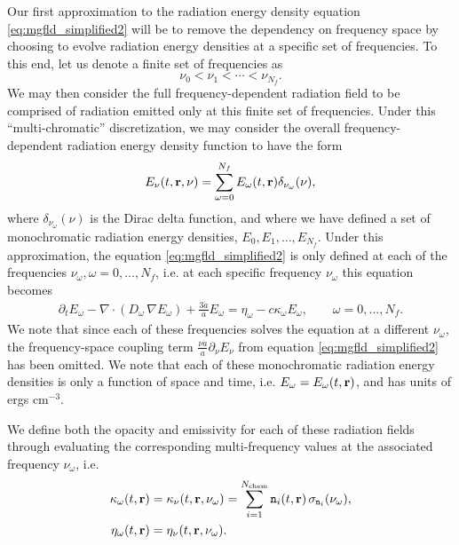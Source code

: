 \documentclass[10pt]{article}
\renewcommand{\(}{\left(}
\renewcommand{\)}{\right)}
\newcommand{\rvec}{{\bf r}}
\newcommand{\adot}{\dot{a}}
\newcommand{\Enu}{E_{\nu}}
\newcommand{\mn}{{\tt n}}
\begin{document}
Our first approximation to the radiation energy density equation
\eqref{eq:mgfld_simplified2} will be to remove the dependency on
frequency space by choosing to evolve radiation energy densities at a
specific set of frequencies.  To this end, let us denote a finite set
of frequencies as
\begin{equation}
\label{eq:multichromatic_frequencies}
  \nu_0 < \nu_1 < \cdots < \nu_{N_f}.
\end{equation}
We may then consider the full frequency-dependent radiation field to
be comprised of radiation emitted only at this finite set of
frequencies.  Under this ``multi-chromatic'' discretization, we may
consider the overall frequency-dependent radiation energy density
function to have the form 
\begin{equation}
\label{eq:multichromatic_radiation}
  \Enu(t,\rvec,\nu) = \sum_{\omega=0}^{N_f} E_{\omega}(t,\rvec) \delta_{\nu_{\omega}}(\nu),
\end{equation}
where $\delta_{\nu_{\omega}}(\nu)$ is the Dirac delta function, and where we
have defined a set of monochromatic radiation energy densities, $E_0,
E_1, \ldots, E_{N_f}$.  Under this approximation, the equation
\eqref{eq:mgfld_simplified2} is only defined at each of the
frequencies $\nu_{\omega}, \omega=0,\ldots,N_f$, i.e. at each specific frequency
$\nu_{\omega}$ this equation becomes
\begin{align}
  \label{eq:mgfld_multichromatic}
  \partial_{t} E_{\omega} - \nabla\cdot(D_{\omega}\,\nabla E_{\omega}) + \frac{3 \adot}{a}
  E_{\omega} = \eta_{\omega} - c \kappa_{\omega} E_{\omega}, \qquad \omega=0,\ldots,N_f.
\end{align}
We note that since each of these frequencies solves the equation at a
different $\nu_{\omega}$, the frequency-space coupling term 
$\frac{\nu \adot}{a}\partial_{\nu}\Enu$ from equation
\eqref{eq:mgfld_simplified2} has been omitted.
We note that each of these monochromatic radiation energy densities is
only a function of space and time, i.e. $E_{\omega} = E_{\omega}(t,\rvec)$, and
has units of ergs cm$^{-3}$.

We define both the opacity and emissivity for each of these radiation
fields through evaluating the corresponding multi-frequency values at
the associated frequency $\nu_{\omega}$, i.e.
\begin{align}
\label{eq:multichromatic_opacity}
  \kappa_{\omega}(t,\rvec) &= \kappa_{\nu}(t,\rvec,\nu_{\omega}) = \sum_{i=1}^{N_\text{chem}} \mn_i(t,\rvec)\, \sigma_{\mn_i} (\nu_{\omega}), \\
\label{eq:multichromatic_emissivity}
  \eta_{\omega}(t,\rvec) &= \eta_{\nu}(t,\rvec,\nu_{\omega}).
\end{align}
\end{document}
